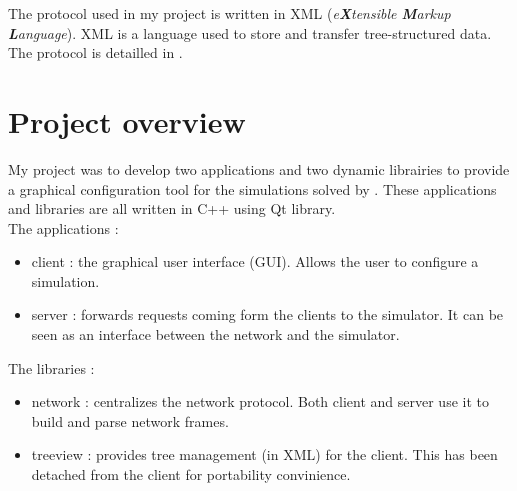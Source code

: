 The protocol used in my project is written in XML (\textit{e\textbf{X}tensible
\textbf{M}arkup \textbf{L}anguage}). XML is a language used to store and
transfer tree-structured data. The protocol is detailled in
.


\section{Project overview}

My project was to develop two applications and two dynamic librairies to provide
a graphical configuration tool for the simulations solved by \cf. These
applications and libraries are all written in C++ using Qt library.\\

The applications : 
\begin{itemize}
 \item client : the graphical user interface (GUI). Allows the user to
configure a simulation.
 \item server : forwards requests coming form the clients to the simulator. It
can be seen as an interface between the network and the simulator.\\
\end{itemize}

The libraries : 
\begin{itemize}
 \item network : centralizes the network protocol. Both client and server use 
it to build and parse network frames.
 \item treeview : provides tree management (in XML) for the client. This has
been detached from the client for portability convinience.\\
\end{itemize}

